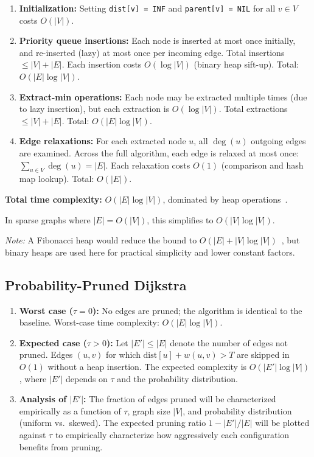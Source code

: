 \begin{enumerate}
    \item \textbf{Initialization:} Setting \texttt{dist[v] = INF} and \texttt{parent[v] = NIL} for all $v \in V$ costs $O(|V|)$.
    \item \textbf{Priority queue insertions:} Each node is inserted at most once initially, and re-inserted (lazy) at most once per incoming edge. Total insertions $\leq |V| + |E|$. Each insertion costs $O(\log|V|)$ (binary heap sift-up). Total: $O(|E|\log|V|)$.
    \item \textbf{Extract-min operations:} Each node may be extracted multiple times (due to lazy insertion), but each extraction is $O(\log|V|)$. Total extractions $\leq |V| + |E|$. Total: $O(|E|\log|V|)$.
    \item \textbf{Edge relaxations:} For each extracted node $u$, all $\deg(u)$ outgoing edges are examined. Across the full algorithm, each edge is relaxed at most once: $\sum_{u\in V} \deg(u) = |E|$. Each relaxation costs $O(1)$ (comparison and hash map lookup). Total: $O(|E|)$.
\end{enumerate}

\noindent\textbf{Total time complexity:} $O(|E|\log|V|)$, dominated by heap operations~\citep{cormen2009}.

In sparse graphs where $|E| = O(|V|)$, this simplifies to $O(|V|\log|V|)$.

\textit{Note:} A Fibonacci heap would reduce the bound to $O(|E| + |V|\log|V|)$~\citep{fredman1987fibonacci}, but binary heaps are used here for practical simplicity and lower constant factors.

\subsection{Probability-Pruned Dijkstra}

\begin{enumerate}
    \item \textbf{Worst case ($\tau = 0$):} No edges are pruned; the algorithm is identical to the baseline. Worst-case time complexity: $O(|E|\log|V|)$.
    \item \textbf{Expected case ($\tau > 0$):} Let $|E'| \leq |E|$ denote the number of edges not pruned. Edges $(u,v)$ for which $\text{dist}[u] + w(u,v) > T$ are skipped in $O(1)$ without a heap insertion. The expected complexity is $O(|E'|\log|V|)$, where $|E'|$ depends on $\tau$ and the probability distribution.
    \item \textbf{Analysis of $|E'|$:} The fraction of edges pruned will be characterized empirically as a function of $\tau$, graph size $|V|$, and probability distribution (uniform vs.\ skewed). The expected pruning ratio $1 - |E'|/|E|$ will be plotted against $\tau$ to empirically characterize how aggressively each configuration benefits from pruning.
\end{enumerate}

